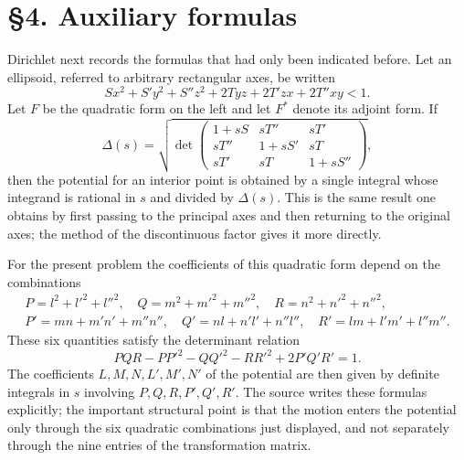 \documentclass[11pt]{article}
\begin{document}
\section*{\S4. Auxiliary formulas}

Dirichlet next records the formulas that had only been indicated before.  Let an ellipsoid, referred to arbitrary rectangular axes, be written
\begin{equation}
 Sx^2+S'y^2+S''z^2+2Tyz+2T'zx+2T''xy<1.
\end{equation}
Let \(F\) be the quadratic form on the left and let \(F^*\) denote its adjoint form.  If
\[
 \Delta(s)=\sqrt{\det\begin{pmatrix}
 1+sS&sT''&sT'\\
 sT''&1+sS'&sT\\
 sT'&sT&1+sS''
 \end{pmatrix}},
\]
then the potential for an interior point is obtained by a single integral whose integrand is rational in \(s\) and divided by \(\Delta(s)\).  This is the same result one obtains by first passing to the principal axes and then returning to the original axes; the method of the discontinuous factor gives it more directly.

For the present problem the coefficients of this quadratic form depend on the combinations
\begin{gather*}
 P=l^2+l'^2+l''^2,
 \quad Q=m^2+m'^2+m''^2,
 \quad R=n^2+n'^2+n''^2,\\
 P'=mn+m'n'+m''n'',
 \quad Q'=nl+n'l'+n''l'',
 \quad R'=lm+l'm'+l''m''.
\end{gather*}
These six quantities satisfy the determinant relation
\begin{equation}
 PQR-PP'^2-QQ'^2-RR'^2+2P'Q'R'=1.
\end{equation}
The coefficients \(L,M,N,L',M',N'\) of the potential are then given by definite integrals in \(s\) involving \(P,Q,R,P',Q',R'\).  The source writes these formulas explicitly; the important structural point is that the motion enters the potential only through the six quadratic combinations just displayed, and not separately through the nine entries of the transformation matrix.
\end{document}
